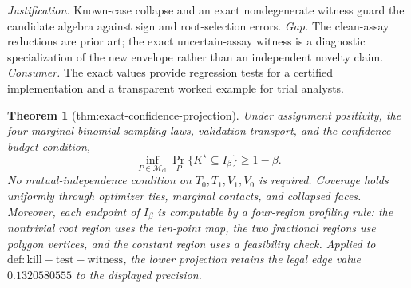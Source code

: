 \documentclass{article}
\newtheorem{theorem}{Theorem}
\begin{document}
\par\smallskip\noindent \textit{Justification.} Known-case collapse and an exact nondegenerate witness guard the candidate algebra against sign and root-selection errors. \textit{Gap.} The clean-assay reductions are prior art; the exact uncertain-assay witness is a diagnostic specialization of the new envelope rather than an independent novelty claim. \textit{Consumer.} The exact values provide regression tests for a certified implementation and a transparent worked example for trial analysts.

\begin{theorem}[thm:exact-confidence-projection]\label{thm:exact-confidence-projection}
Under assignment positivity, the four marginal binomial sampling laws, validation transport, and the confidence-budget condition, \[\inf_{P\in\mathcal M_{\mathrm{cl}}}\Pr_P\{K^{\star}\subseteq I_{\beta}\}\ge1-\beta.\] No mutual-independence condition on \(T_0,T_1,V_1,V_0\) is required. Coverage holds uniformly through optimizer ties, marginal contacts, and collapsed faces. Moreover, each endpoint of \(I_{\beta}\) is computable by a four-region profiling rule: the nontrivial root region uses the ten-point map, the two fractional regions use polygon vertices, and the constant region uses a feasibility check. Applied to \(\mathrm{def:kill-test-witness}\), the lower projection retains the legal edge value \(0.1320580555\) to the displayed precision.
\end{theorem}
\end{document}
